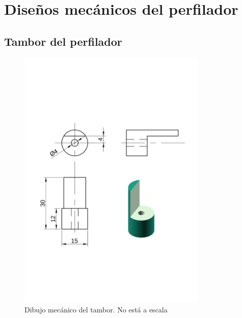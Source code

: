 \documentclass[12pt,a4paper]{article}
\begin{document}
    \clearpage
    \appendix
    \section{Diseños mecánicos del perfilador}
    \subsection{Tambor del perfilador}
    \vfill
    \begin{figure}[H]
    \centering
    \includegraphics[width=0.8\textwidth]{fig/perfilador/tambor_mecanico}
    \caption{Dibujo mecánico del tambor. No está a escala}
    \label{fig:perfilador/tambor_plano}
    \end{figure}
    \vfill

    \clearpage
\end{document}

